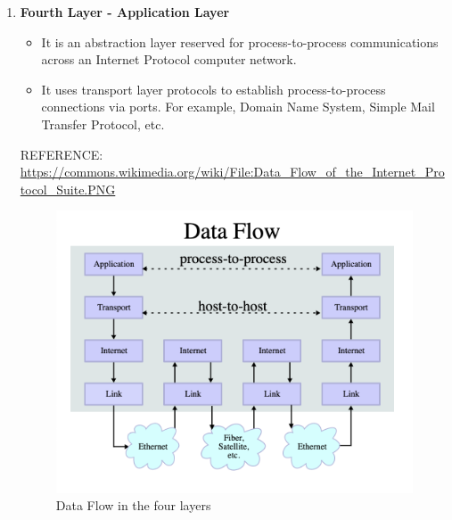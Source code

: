 \documentclass{resources/WeSTassignment}
\begin{document}
\begin{enumerate}
\begin{enumerate}
\begin{itemize}
	\end{itemize}
    \item \textbf{Fourth Layer - Application Layer}
	\begin{itemize}
    		\item It is an abstraction layer reserved for process-to-process communications across an Internet Protocol computer network.
		\item It uses transport layer protocols to establish process-to-process connections via ports. For example, Domain Name System, Simple Mail Transfer Protocol, etc.
	\end{itemize}
	\bigbreak   REFERENCE: \url{https://commons.wikimedia.org/wiki/File:Data_Flow_of_the_Internet_Protocol_Suite.PNG}
\begin{figure}[h!]
  \includegraphics[width=\linewidth]{resources/data-flow.png}
  \caption{Data Flow in the four layers}
  \label{Data Flow of the Internet Protocol Suite}
\end{figure}
\end{enumerate}

\end{enumerate}
\end{document}

